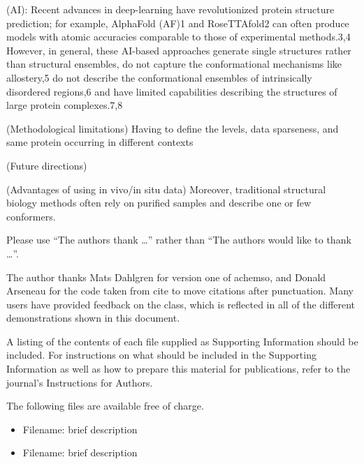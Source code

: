 \documentclass[journal=jcim,manuscript=article]{achemso}
\begin{document}
(AI): Recent advances in deep-learning have revolutionized protein structure prediction; for example, AlphaFold (AF)1 and RoseTTAfold2 can often produce models with atomic accuracies comparable to those of experimental methods.3,4 However, in general, these AI-based approaches generate single structures rather than structural ensembles, do not capture the conformational mechanisms like allostery,5 do not describe the conformational ensembles of intrinsically disordered regions,6 and have limited capabilities describing the structures of large protein complexes.7,8 

(Methodological limitations) Having to define the levels, data sparseness, and same protein occurring in different contexts 

(Future directions)

(Advantages of using in vivo/in situ data) Moreover, traditional structural biology methods often rely on purified samples and describe one or few conformers. 

\begin{acknowledgement}

Please use ``The authors thank \ldots'' rather than ``The
authors would like to thank \ldots''.

The author thanks Mats Dahlgren for version one of \textsf{achemso},
and Donald Arseneau for the code taken from \textsf{cite} to move
citations after punctuation. Many users have provided feedback on the
class, which is reflected in all of the different demonstrations
shown in this document.

\end{acknowledgement}

\begin{suppinfo}

A listing of the contents of each file supplied as Supporting Information
should be included. For instructions on what should be included in the
Supporting Information as well as how to prepare this material for
publications, refer to the journal's Instructions for Authors.

The following files are available free of charge.
\begin{itemize}
  \item Filename: brief description
  \item Filename: brief description
\end{itemize}

\end{suppinfo}
\end{document}
